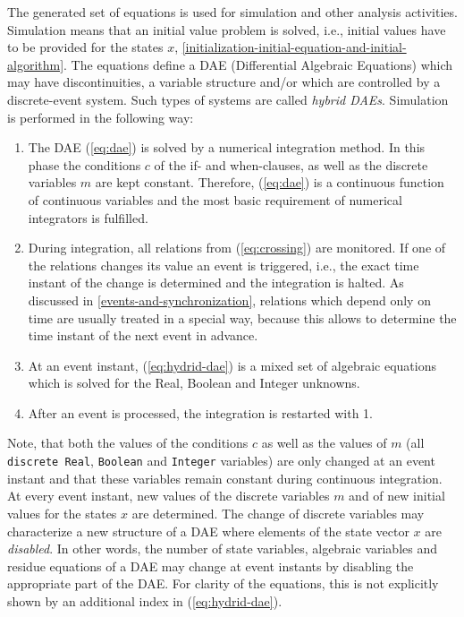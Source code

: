 The generated set of equations is used for simulation and other analysis
activities. Simulation means that an initial value problem is solved,
i.e., initial values have to be provided for the states $x$, \autoref{initialization-initial-equation-and-initial-algorithm}.
The equations define a DAE (Differential Algebraic Equations) which may
have discontinuities, a variable structure and/or which are controlled
by a discrete-event system. Such types of systems are called
\emph{hybrid DAEs}. Simulation is performed in the following way:
\begin{enumerate}
\item
  The DAE (\ref{eq:dae}) is solved by a numerical integration method. In this
  phase the conditions $c$ of the if- and when-clauses, as well as the
  discrete variables $m$ are kept constant. Therefore, (\ref{eq:dae}) is a
  continuous function of continuous variables and the most basic
  requirement of numerical integrators is fulfilled.
\item
  During integration, all relations from (\ref{eq:crossing}) are monitored. If one of
  the relations changes its value an event is triggered, i.e., the exact
  time instant of the change is determined and the integration is
  halted. As discussed in \autoref{events-and-synchronization}, relations which depend only on
  time are usually treated in a special way, because this allows to
  determine the time instant of the next event in advance.
\item
  At an event instant, (\ref{eq:hydrid-dae}) is a mixed set of algebraic equations which
  is solved for the Real, Boolean and Integer unknowns.
\item
  After an event is processed, the integration is restarted with 1.
\end{enumerate}

Note, that both the values of the conditions $c$ as well as the values of
$m$ (all \lstinline!discrete Real!, \lstinline!Boolean! and \lstinline!Integer! variables) are only changed at
an event instant and that these variables remain constant during
continuous integration. At every event instant, new values of the
discrete variables $m$ and of new initial values for the states $x$ are
determined. The change of discrete variables may characterize a new
structure of a DAE where elements of the state vector $x$ are
\emph{disabled}. In other words, the number of state variables,
algebraic variables and residue equations of a DAE may change at event
instants by disabling the appropriate part of the DAE. For clarity of
the equations, this is not explicitly shown by an additional index in
(\ref{eq:hydrid-dae}).

